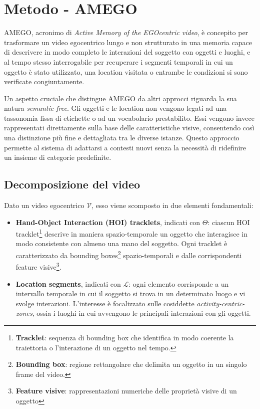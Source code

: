 \chapter{Metodo - AMEGO} 
AMEGO, acronimo di \emph{Active Memory of the EGOcentric video}, è concepito per trasformare un video egocentrico lungo e non strutturato in una memoria capace di descrivere in modo completo le interazioni del soggetto con oggetti e luoghi, e al tempo stesso interrogabile per recuperare i segmenti temporali in cui un oggetto è stato utilizzato, una location visitata o entrambe le condizioni si sono verificate congiuntamente.

Un aspetto cruciale che distingue AMEGO da altri approcci riguarda la sua natura \emph{semantic-free}.  
Gli oggetti e le location non vengono legati ad una tassonomia fissa di etichette o ad un vocabolario prestabilito. Essi vengono invece rappresentati direttamente sulla base delle caratteristiche visive, consentendo così una distinzione più fine e dettagliata tra le diverse istanze. Questo approccio permette al sistema di adattarsi a contesti nuovi senza la necessità di ridefinire un insieme di categorie predefinite.

\section{Decomposizione del video}
Dato un video egocentrico $\mathcal{V}$, esso viene scomposto in due elementi fondamentali:

\begin{itemize}
    \item \textbf{Hand-Object Interaction (HOI) tracklets}, indicati con $\Theta$: ciascun HOI tracklet\footnote{\textbf{Tracklet}: sequenza di bounding box che identifica in modo coerente la traiettoria o l'interazione di un oggetto nel tempo.} descrive in maniera spazio-temporale un oggetto che interagisce in modo consistente con almeno una mano del soggetto. Ogni tracklet è caratterizzato da bounding boxes\footnote{\textbf{Bounding box}: regione rettangolare che delimita un oggetto in un singolo frame del video.} spazio-temporali e dalle corrispondenti feature visive\footnote{\textbf{Feature visive}: rappresentazioni numeriche delle proprietà visive di un oggetto}.
    
    \item \textbf{Location segments}, indicati con $\mathcal{L}$: ogni elemento corrisponde a un intervallo temporale in cui il soggetto si trova in un determinato luogo e vi svolge interazioni. L'interesse è focalizzato sulle cosiddette \emph{activity-centric-zones}, ossia i luoghi in cui avvengono le principali interazioni con gli oggetti.
\end{itemize}

